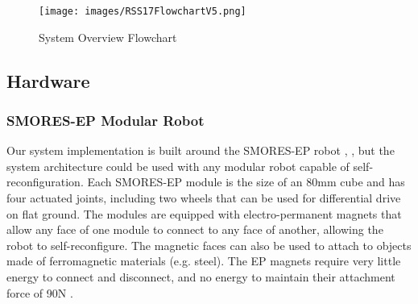 \documentclass[journal]{IEEEtran}
\begin{document}
%
\begin{figure}
\begin{center}
\texttt{[image: images/RSS17FlowchartV5.png]}
\caption{System Overview Flowchart}
\label{fig:overview}
\end{center}
\vspace{-1em}
\end{figure}

%


\subsection{Hardware} %
\label{sec:hardware}
%
\subsubsection{SMORES-EP Modular Robot} \label{sec:smores}
%
Our system implementation is built around the SMORES-EP robot \cite{tosun2016design},
\cite{tosun2017paintpots}, but the system architecture could
be used with any modular robot capable of self-reconfiguration. Each SMORES-EP module is the size of an 80mm cube
and has four actuated joints, including two wheels that can be
used for differential drive on flat ground.  The modules are equipped
with electro-permanent magnets that allow any face of one module to connect to
any face of another, allowing the robot to self-reconfigure. The magnetic faces
can also be used to attach to objects made of ferromagnetic materials (e.g. steel). 
The EP magnets require very little energy to connect and disconnect, and no energy to maintain their attachment force of 90N \cite{tosun2016design}.
\end{document}
